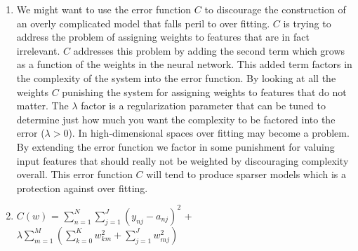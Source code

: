 \documentclass[solution, letterpaper]{cs121}
\begin{document}
\problem{}
\begin{enumerate}
	\item We might want to use the error function $C$ to discourage the construction of an overly complicated model that falls peril to over fitting. $C$ is trying to address the problem of assigning weights to features that are in fact irrelevant. $C$ addresses this problem by adding the second term which grows as a function of the weights in the neural network. This added term factors in the complexity of the system into the error function. By looking at all the weights $C$ punishing the system for assigning weights to features that do not matter. The $\lambda$ factor is a regularization parameter that can be tuned to determine just how much you want the complexity to be factored into the error ($\lambda > 0$). In high-dimensional spaces over fitting may become a problem. By extending the error function we factor in some punishment for valuing input features that should really not be weighted by discouraging complexity overall. This error function $C$ will tend to produce sparser models which is a protection against over fitting. 
	\item
\begin{center}
	$C(w)$ = $\displaystyle\sum\limits_{n=1}^N \displaystyle\sum\limits_{j=1}^J (y_{nj} - a_{nj})^2$ +  $\lambda \displaystyle\sum\limits_{m=1}^M 
	\left(\displaystyle\sum\limits_{k=0}^K  w_{km}^2 +
	\displaystyle\sum\limits_{j=1}^J w_{mj}^2\right)$
	
\end{center}

\end{enumerate}
\end{document}
